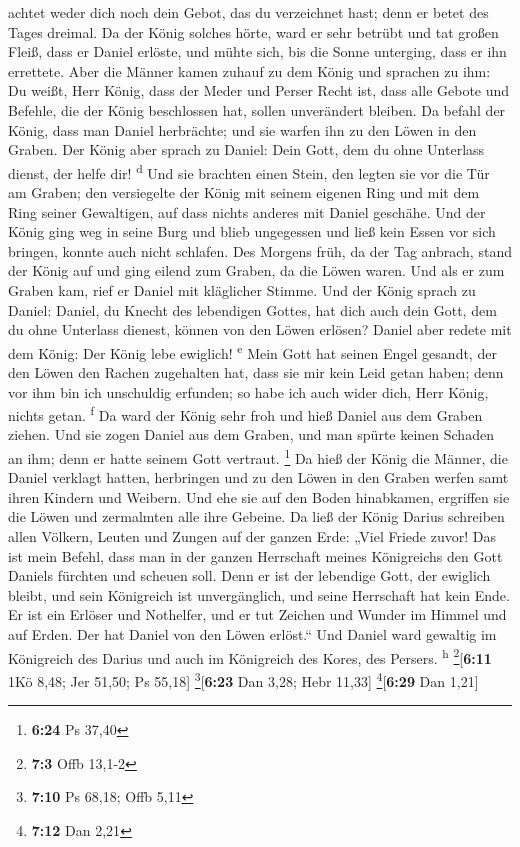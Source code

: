 achtet weder dich noch dein Gebot, das du verzeichnet hast; denn er
betet des Tages dreimal.  Da der König solches hörte,
ward er sehr betrübt und tat großen Fleiß, dass er Daniel erlöste, und
mühte sich, bis die Sonne unterging, dass er ihn errettete.
 Aber die Männer kamen zuhauf zu dem König und sprachen
zu ihm: Du weißt, Herr König, dass der Meder und Perser Recht ist, dass
alle Gebote und Befehle, die der König beschlossen hat, sollen
unverändert bleiben.  Da befahl der König, dass man
Daniel herbrächte; und sie warfen ihn zu den Löwen in den Graben. Der
König aber sprach zu Daniel: Dein Gott, dem du ohne Unterlass dienst,
der helfe dir! \textsuperscript{d}  Und sie brachten
einen Stein, den legten sie vor die Tür am Graben; den versiegelte der
König mit seinem eigenen Ring und mit dem Ring seiner Gewaltigen, auf
dass nichts anderes mit Daniel geschähe.  Und der König
ging weg in seine Burg und blieb ungegessen und ließ kein Essen vor sich
bringen, konnte auch nicht schlafen.  Des Morgens früh,
da der Tag anbrach, stand der König auf und ging eilend zum Graben, da
die Löwen waren.  Und als er zum Graben kam, rief er
Daniel mit kläglicher Stimme. Und der König sprach zu Daniel: Daniel, du
Knecht des lebendigen Gottes, hat dich auch dein Gott, dem du ohne
Unterlass dienest, können von den Löwen erlösen?  Daniel
aber redete mit dem König: Der König lebe ewiglich! \textsuperscript{e}
 Mein Gott hat seinen Engel gesandt, der den Löwen den
Rachen zugehalten hat, dass sie mir kein Leid getan haben; denn vor ihm
bin ich unschuldig erfunden; so habe ich auch wider dich, Herr König,
nichts getan. \textsuperscript{f}  Da ward der König sehr
froh und hieß Daniel aus dem Graben ziehen. Und sie zogen Daniel aus dem
Graben, und man spürte keinen Schaden an ihm; denn er hatte seinem Gott
vertraut. \footnote{\textbf{6:24} Ps 37,40}  Da hieß der
König die Männer, die Daniel verklagt hatten, herbringen und zu den
Löwen in den Graben werfen samt ihren Kindern und Weibern. Und ehe sie
auf den Boden hinabkamen, ergriffen sie die Löwen und zermalmten alle
ihre Gebeine.  Da ließ der König Darius schreiben allen
Völkern, Leuten und Zungen auf der ganzen Erde: „Viel Friede zuvor!
 Das ist mein Befehl, dass man in der ganzen Herrschaft
meines Königreichs den Gott Daniels fürchten und scheuen soll. Denn er
ist der lebendige Gott, der ewiglich bleibt, und sein Königreich ist
unvergänglich, und seine Herrschaft hat kein Ende.  Er
ist ein Erlöser und Nothelfer, und er tut Zeichen und Wunder im Himmel
und auf Erden. Der hat Daniel von den Löwen erlöst.`` 
Und Daniel ward gewaltig im Königreich des Darius und auch im Königreich
des Kores, des Persers. \textsuperscript{h} \footnote{\textbf{7:3} Offb
  13,1-2}{[}\textbf{6:11} 1Kö 8,48; Jer 51,50; Ps 55,18{]}
\footnote{\textbf{7:10} Ps 68,18; Offb 5,11}{[}\textbf{6:23} Dan 3,28;
Hebr 11,33{]} \footnote{\textbf{7:12} Dan 2,21}{[}\textbf{6:29} Dan
1,21{]}

